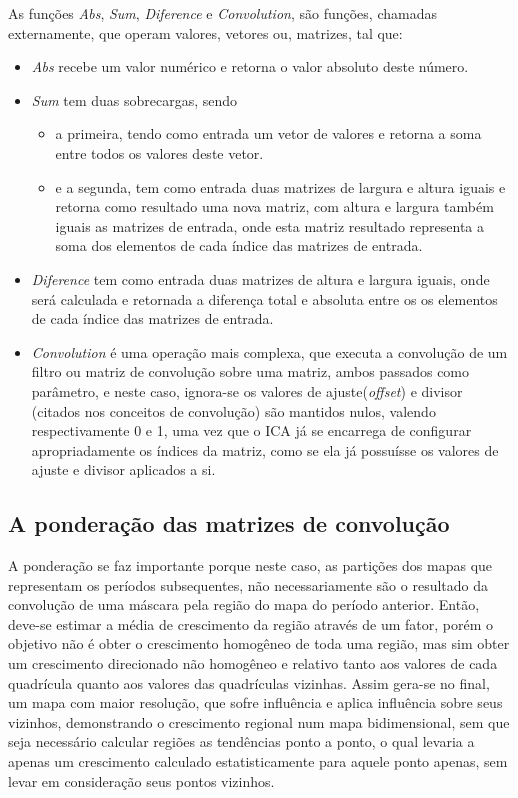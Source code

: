 As funções \emph{Abs}, \emph{Sum}, \emph{Diference} e \emph{Convolution}, são funções, chamadas externamente, que operam valores, vetores ou, matrizes, tal que:
\begin{itemize}
\item \emph{Abs} recebe um valor numérico e retorna o valor absoluto deste número.
\item \emph{Sum} tem duas sobrecargas, sendo
\begin{itemize}
\item a primeira, tendo como entrada um vetor de valores e retorna a soma entre todos os valores deste vetor.
\item e a segunda, tem como entrada duas matrizes de largura e altura iguais e retorna como resultado uma nova matriz, com altura e largura também iguais as matrizes de entrada, onde esta matriz resultado representa a soma dos elementos de cada índice das matrizes de entrada.
\end{itemize}
\item \emph{Diference} tem como entrada duas matrizes de altura e largura iguais, onde será calculada e retornada a diferença total e absoluta entre os os elementos de cada índice das matrizes de entrada.
\item \emph{Convolution} é uma operação mais complexa, que executa a convolução de um filtro ou matriz de convolução sobre uma matriz, ambos passados como parâmetro, e neste caso, ignora-se os valores de ajuste(\emph{offset}) e divisor (citados nos conceitos de convolução) são mantidos nulos, valendo respectivamente 0 e 1, uma vez que o ICA já se encarrega de configurar apropriadamente os índices da matriz, como se ela já possuísse os valores de ajuste e divisor aplicados a si.
\end{itemize}








\subsection{A ponderação das matrizes de convolução}
\label{A ponderação das matrizes de convolução}

A ponderação se faz importante porque neste caso, as partições dos mapas que representam os períodos subsequentes, não necessariamente são o resultado da convolução de uma máscara pela região do mapa do período anterior. Então, deve-se estimar a média de crescimento da região através de um fator, porém o objetivo não é obter o crescimento homogêneo de toda uma região, mas sim obter um crescimento direcionado não homogêneo e relativo tanto aos valores de cada quadrícula quanto aos valores das quadrículas vizinhas. Assim gera-se no final, um mapa com maior resolução, que sofre influência e aplica influência sobre seus vizinhos, demonstrando o crescimento regional num mapa bidimensional, sem que seja necessário calcular regiões as tendências ponto a ponto, o qual levaria a apenas um crescimento calculado estatisticamente para aquele ponto apenas, sem levar em consideração seus pontos vizinhos.

